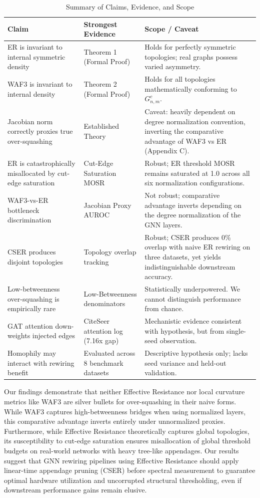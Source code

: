 \documentclass[10pt]{article} %
\begin{document}
\begin{table}[h]
\centering
\caption{Summary of Claims, Evidence, and Scope}
\label{tab:claims}
\begin{tabularx}{\textwidth}{p{4.5cm}XX}
\toprule
\textbf{Claim} & \textbf{Strongest Evidence} & \textbf{Scope / Caveat} \\ \midrule
ER is invariant to internal symmetric density & Theorem 1 (Formal Proof) & Holds for perfectly symmetric topologies; real graphs possess varied asymmetry. \\
WAF3 is invariant to internal density & Theorem 2 (Formal Proof) & Holds for all topologies mathematically conforming to $G^c_{n,m}$. \\
Jacobian norm correctly proxies true over-squashing & Established Theory & Caveat: heavily dependent on degree normalization convention, inverting the comparative advantage of WAF3 vs ER (Appendix C). \\
ER is catastrophically misallocated by cut-edge saturation & Cut-Edge Saturation MOSR & Robust; ER threshold MOSR remains saturated at 1.0 across all six normalization configurations. \\
WAF3-vs-ER bottleneck discrimination & Jacobian Proxy AUROC & Not robust; comparative advantage inverts depending on the degree normalization of the GNN layers. \\
CSER produces disjoint topologies & Topology overlap tracking & Robust; CSER produces 0\% overlap with naive ER rewiring on three datasets, yet yields indistinguishable downstream accuracy. \\
Low-betweenness over-squashing is empirically rare & Low-Betweenness denominators & Statistically underpowered. We cannot distinguish performance from chance. \\
GAT attention down-weights injected edges & CiteSeer attention log (7.16x gap) & Mechanistic evidence consistent with hypothesis, but from single-seed observation. \\
Homophily may interact with rewiring benefit & Evaluated across 8 benchmark datasets & Descriptive hypothesis only; lacks seed variance and held-out validation. \\ \bottomrule
\end{tabularx}
\end{table}

Our findings demonstrate that neither Effective Resistance nor local curvature metrics like WAF3 are silver bullets for over-squashing in their naive forms. While WAF3 captures high-betweenness bridges when using normalized layers, this comparative advantage inverts entirely under unnormalized proxies. Furthermore, while Effective Resistance theoretically captures global topologies, its susceptibility to cut-edge saturation ensures misallocation of global threshold budgets on real-world networks with heavy tree-like appendages. Our results suggest that GNN rewiring pipelines using Effective Resistance should apply linear-time appendage pruning (CSER) before spectral measurement to guarantee optimal hardware utilization and uncorrupted structural thresholding, even if downstream performance gains remain elusive. 
\end{document}
